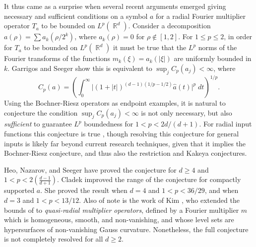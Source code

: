 \documentclass[11pt]{article}
\DeclareMathOperator{\RR}{\mathbb{R}}
\begin{document}
It thus came as a surprise when several recent arguments \cites{GarrigosSeeger,HeoNazarovSeeger,Cladek,KimQuasiradial} emerged giving necessary and sufficient conditions on a symbol $a$ for a radial Fourier multiplier operator $T_a$ to be bounded on $L^p(\RR^d)$.
Consider a decomposition $a(\rho) = \sum a_k( \rho / 2^k)$, where $a_k(\rho) = 0$ for $\rho \not \in [1,2]$. For $1 \leq p \leq 2$, in order for $T_a$ to be bounded on $L^p(\RR^d)$ it must be true that the $L^p$ norms of the Fourier transforms of the functions $m_k(\xi) = a_k(|\xi|)$ are uniformly bounded in $k$. Garrigos and Seeger \cite{GarrigosSeeger} show this is equivalent to $\sup_j C_p(a_j) < \infty$, where
%
\[ C_p(a) = \left( \int_0^\infty \big| (1 + |t|)^{(d-1)(1/p - 1/2)} \widehat{a}(t) \big|^p\; dt \right)^{1/p}. \] %
%
Using the Bochner-Riesz operators as endpoint examples, it is natural to conjecture the condition $\sup_j C_p(a_j) < \infty$ is not only necessary, but also \emph{sufficient} to guarantee $L^p$ boundedness for $1 < p < 2d/(d+1)$. For radial input functions this conjecture is true \cite{GarrigosSeeger}, though resolving this conjecture for general inputs is likely far beyond current research techniques, given that it implies the Bochner-Riesz conjecture, and thus also the restriction and Kakeya conjectures.

Heo, Nazarov, and Seeger \cite{HeoNazarovSeeger} have proved the conjecture for $d \geq 4$ and $1 < p < 2 {\scriptstyle \left( \frac{d-1}{d+1} \right)}$. Cladek \cite{Cladek} improved the range of the conjecture for compactly supported $a$. She proved the result when $d = 4$ and $1 < p < 36/29$, and when $d = 3$ and $1 < p < 13/12$. Also of note is the work of Kim \cite{KimQuasiradial}, who extended the bounds of \cite{HeoNazarovSeeger} to \emph{quasi-radial multiplier operators}, defined by a Fourier multiplier $m$ which is homogeneous, smooth, and non-vanishing, and whose level sets are hypersurfaces of non-vanishing Gauss curvature. Nonetheless, the full conjecture is not completely resolved for all $d \geq 2$.
\end{document}
